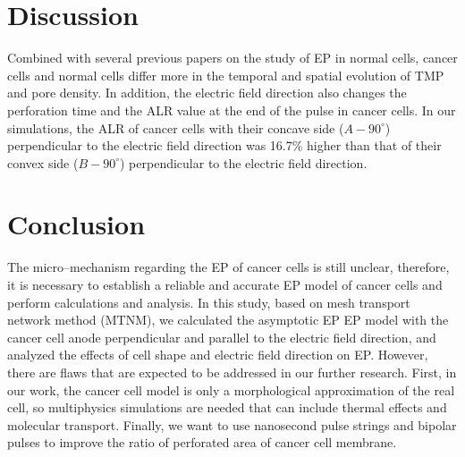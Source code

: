 \documentclass[conference]{IEEEtran}
\begin{document}
\section{Discussion}
Combined with several previous papers on the study of EP in normal cells, cancer cells and normal cells differ more in the temporal and spatial evolution of TMP and pore density. In addition, the electric field direction also changes the perforation time and the ALR value at the end of the pulse in cancer cells. In our simulations, the ALR of cancer cells with their concave side ($A-90^{\circ}$) perpendicular to the electric field direction was 16.7\% higher than that of their convex side ($B-90^{\circ}$) perpendicular to the electric field direction.
\section{Conclusion}
The micro--mechanism regarding the EP of cancer cells is still unclear, therefore, it is necessary to establish a reliable and accurate EP model of cancer cells and perform calculations and analysis. In this study, based on mesh transport network method (MTNM), we calculated the asymptotic EP EP model with the cancer cell anode perpendicular and parallel to the electric field direction, and analyzed the effects of cell shape and electric field direction on EP. However, there are flaws that are expected to be addressed in our further research. First, in our work, the cancer cell model is only a morphological approximation of the real cell, so multiphysics simulations are needed that can include thermal effects and molecular transport. Finally, we want to use nanosecond pulse strings and bipolar pulses to improve the ratio of perforated area of cancer cell membrane.



\end{document}
